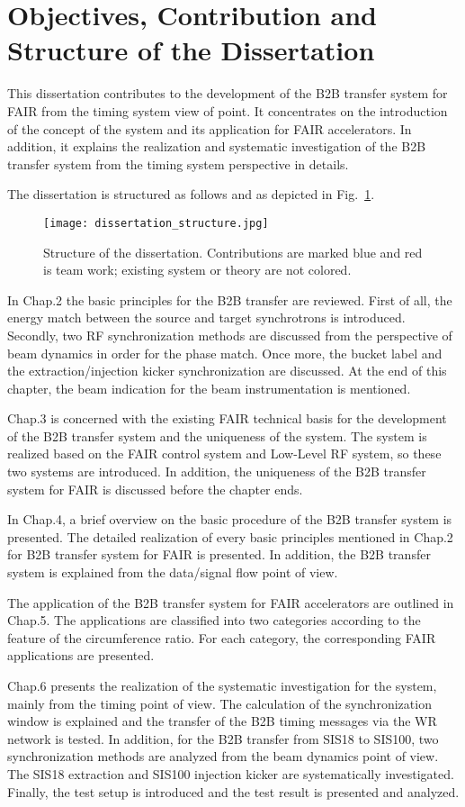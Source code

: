\section{Objectives, Contribution and Structure of the Dissertation}
This dissertation contributes to the development of the B2B transfer system for FAIR from the timing system view of point. It concentrates on the introduction of the concept of the system and its application for FAIR accelerators. In addition, it explains the realization and systematic investigation of the B2B transfer system from the timing system perspective in details.

The dissertation is structured as follows and as depicted in Fig.~\ref{dissertation_structure}.
\begin{figure}[H]
   \centering   
   \texttt{[image: dissertation\_structure.jpg]}
   \caption{Structure of the dissertation. Contributions are marked blue and red is team work; existing system or theory are not colored.}
   \label{dissertation_structure}
\end{figure}

In Chap.2 the basic principles for the B2B transfer are reviewed. First of all, the energy match between the source and target synchrotrons is introduced. Secondly, two RF synchronization methods are discussed from the perspective of beam dynamics in order for the phase match. Once more, the bucket label and the extraction/injection kicker synchronization are discussed. At the end of this chapter, the beam indication for the beam instrumentation is mentioned.

Chap.3 is concerned with the existing FAIR technical basis for the development of the B2B transfer system and the uniqueness of the system. The system is realized based on the FAIR control system and Low-Level RF system, so these two systems are introduced. In addition, the uniqueness of the B2B transfer system for FAIR is discussed before the chapter ends. 

In Chap.4, a brief overview on the basic procedure of the B2B transfer system is presented. The detailed realization of every basic principles mentioned in Chap.2 for B2B transfer system for FAIR is presented. In addition, the B2B transfer system is explained from the data/signal flow point of view.

The application of the B2B transfer system for FAIR accelerators are outlined in Chap.5. The applications are classified into two categories according to the feature of the circumference ratio. For each category, the corresponding FAIR applications are presented. 

Chap.6 presents the realization of the systematic investigation for the system, mainly from the timing point of view. The calculation of the synchronization window is explained and the transfer of the B2B timing messages via the WR network is tested. In addition, for the B2B transfer from SIS18 to SIS100, two synchronization methods are analyzed from the beam dynamics point of view. The SIS18 extraction and SIS100 injection kicker are systematically investigated. Finally, the test setup is introduced and the test result is presented and analyzed.

%
%

